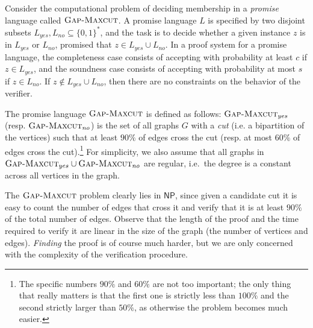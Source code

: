 \documentclass[11pt]{article}
\theoremstyle{definition}
\newcommand{\GX}{\textsc{Gap}\textsc{-}\penalty-1000\textsc{Maxcut}}
\newcommand{\class}[1]{\ensuremath{\mathsf{#1}}\xspace}
\newcommand{\NP}{\class{NP}} %
\begin{document}


Consider the computational problem of deciding membership in a \emph{promise} language called $\GX$. 
A promise language $L$ is specified by two disjoint subsets $L_{yes},L_{no}\subseteq\{0,1\}^*$, and the task is to decide whether a given instance $z$ is in $L_{yes}$ or $L_{no}$, promised that $z \in L_{yes} \cup L_{no}$. In a proof system for a promise language, the completeness case consists of accepting with probability at least $c$ if $z \in L_{yes}$, and the soundness case consists of accepting with probability at most $s$ if $z \in L_{no}$. If $z \notin L_{yes} \cup L_{no}$, then there are no constraints on the behavior of the verifier.




The promise language $\GX$ is defined as follows: $\GX_{yes}$ (resp. $\GX_{no}$) is the set of all graphs $G$ %
with a \emph{cut} (i.e. a bipartition of the vertices) such that at least $90\%$ of edges cross the cut (resp. at most $60\%$ of edges cross the cut).\footnote{The specific numbers $90\%$ and $60\%$ are not too important; the only thing that really matters is that the first one is strictly less than $100\%$ and the second strictly larger than $50\%$, as otherwise the problem becomes much easier.} For simplicity, we also assume that all graphs in $\GX_{yes}\cup \GX_{no}$ are regular, i.e.\ the degree is a constant across all vertices in the graph. 

The $\GX$ problem clearly lies in $\NP$, since given a candidate cut it is easy to count the number of edges that cross it and verify that it is at least $90\%$ of the total number of edges. Observe that the length of the proof and the time required to verify it are linear in the size of the graph (the number of vertices and edges). \emph{Finding} the proof is of course much harder, but we are only concerned with the complexity of the verification procedure.
\end{document}
